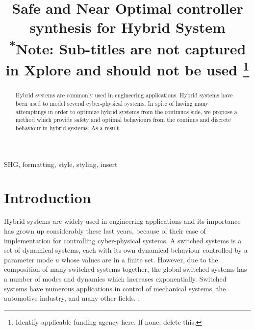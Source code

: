 \documentclass[conference]{IEEEtran}
\begin{document}
\title{Safe and Near Optimal controller synthesis for Hybrid System\\
{\footnotesize \textsuperscript{*}Note: Sub-titles are not captured in Xplore and
should not be used}
\thanks{Identify applicable funding agency here. If none, delete this.}
}

\author{
\and
{}
\and
{}
}

\maketitle

\begin{abstract}
    Hybrid systems are commonly used in engineering 
applications. Hybrid systems have been used to model several
cyber-physical systems. In spite of having many attemptings in order
to optimize hybrid systems from the continuos side, we propose a method which
provide safety and optimal behaviours from the continus and discrete behaviour
in hybrid systems. As a result 

\end{abstract}

\begin{IEEEkeywords}
SHG, formatting, style, styling, insert
\end{IEEEkeywords}

\section{Introduction}
Hybrid systems are widely used in engineering applications and its 
importance has grown up considerably these last years, because of their 
ease of implementation for controlling cyber-physical systems.
A switched systems is a set of dynamical systems, each with its own 
dynamical behaviour controlled by a parameter mode $u$ whose values 
are in a finite set. However, due to the composition of many switched systems together, the global switched systems has a number of modes and dynamics which increases exponentially. 
Switched systems have numerous applications in control of mechanical systems, the automotive industry, and many other fields. 
\cite{larsen2016online}.
\end{document}
